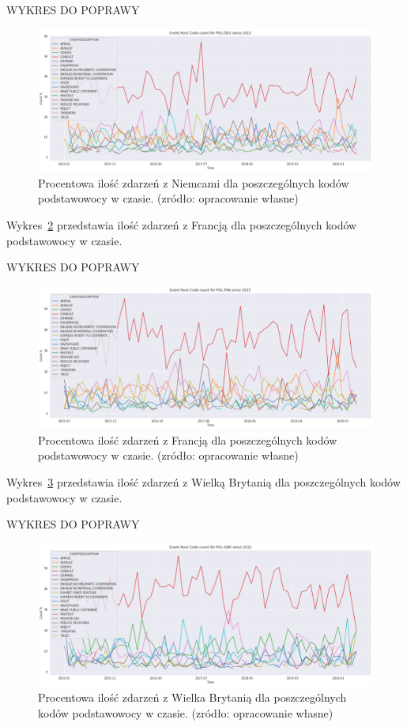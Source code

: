 \documentclass[11pt]{report}
\begin{document}
    WYKRES DO POPRAWY
    \begin{figure}[ht]
        \centering
        \includegraphics[width=1 \textwidth]{fig/PL/POLDEUERCperc.png}
        \caption{Procentowa ilość zdarzeń z Niemcami dla poszczególnych kodów podstawowocy w czasie. (zródło: opracowanie własne)}
        \label{fig:PLDEUERC}
    \end{figure}

    Wykres~\ref{fig:PLFRAERC} przedstawia ilość zdarzeń z Francją dla poszczególnych kodów podstawowocy w czasie.


    WYKRES DO POPRAWY
    \begin{figure}[ht]
        \centering
        \includegraphics[width=1 \textwidth]{fig/PL/POLFRAERCperc.png}
        \caption{Procentowa ilość zdarzeń z Francją dla poszczególnych kodów podstawowocy w czasie. (zródło: opracowanie własne)}
        \label{fig:PLFRAERC}
    \end{figure}

    Wykres~\ref{fig:PLGBRERC} przedstawia ilość zdarzeń z Wielką Brytanią dla poszczególnych kodów podstawowocy w czasie.

    WYKRES DO POPRAWY
    \begin{figure}[ht]
        \centering
        \includegraphics[width=1 \textwidth]{fig/PL/POLGBRERCperc.png}
        \caption{Procentowa ilość zdarzeń z Wielka Brytanią dla poszczególnych kodów podstawowocy w czasie. (zródło: opracowanie własne)}
        \label{fig:PLGBRERC}
    \end{figure}
\end{document}
